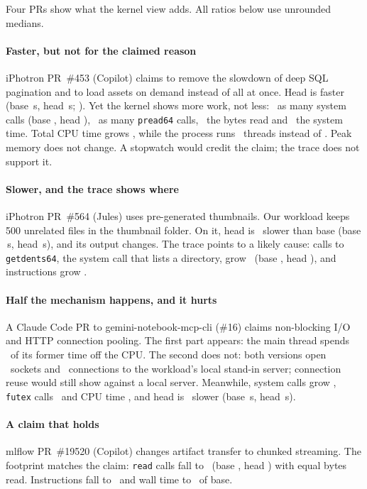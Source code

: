 Four PRs show what the kernel view adds. All ratios below use unrounded
medians.

\paragraph{Faster, but not for the claimed reason}
iPhotron PR~\#453 (Copilot) claims to remove the slowdown of deep SQL
pagination and to load assets on demand instead of all at once. Head is faster
(base \caseAWallBase\,s, head \caseAWallHead\,s; \caseAWall). Yet the kernel shows more work, not less: \caseASyscalls\
as many system calls (base \caseASyscallsBase, head \caseASyscallsHead),
\caseAPread\ as many \texttt{pread64} calls, \caseABytes\ the bytes read
and \caseASys\ the system time. Total CPU time grows \caseATask, while the
process runs \caseAThreadsHead\ threads instead of \caseAThreadsBase. Peak
memory does not change. A stopwatch would credit the claim; the trace does
not support it.

\paragraph{Slower, and the trace shows where}
iPhotron PR~\#564 (Jules) uses pre-generated thumbnails. Our workload keeps
500 unrelated files in the thumbnail folder. On it, head is \caseBWall\
slower than base (base \caseBWallBase\,s, head \caseBWallHead\,s), and its
output changes. The trace points to a likely cause: calls to
\texttt{getdents64}, the system call that lists a directory, grow
\caseBGetdents\ (base \caseBGetdentsBase, head \caseBGetdentsHead), and
instructions grow \caseBInstr.

\paragraph{Half the mechanism happens, and it hurts}
A Claude Code PR to gemini-notebook-mcp-cli (\#16) claims non-blocking I/O
and HTTP connection pooling. The first part appears: the main thread
spends \caseDOffcpu\ of its former time off the CPU. The second does not:
both versions open \caseDSocketHead\ sockets and \caseDConnectHead\
connections to the workload's local stand-in server; connection reuse
would still show against a local server. Meanwhile, system
calls grow \caseDSyscalls, \texttt{futex} calls \caseDFutexc\ and CPU time
\caseDTask, and head is \caseDWall\ slower (base \caseDWallBase\,s, head
\caseDWallHead\,s).

\paragraph{A claim that holds}
mlflow PR~\#19520 (Copilot) changes artifact transfer to chunked
streaming. The footprint matches the claim: \texttt{read} calls fall to
\caseCRead\ (base \caseCReadBase, head \caseCReadHead) with equal bytes
read. Instructions fall to \caseCInstr\ and wall time to
\caseCWall\ of base.
